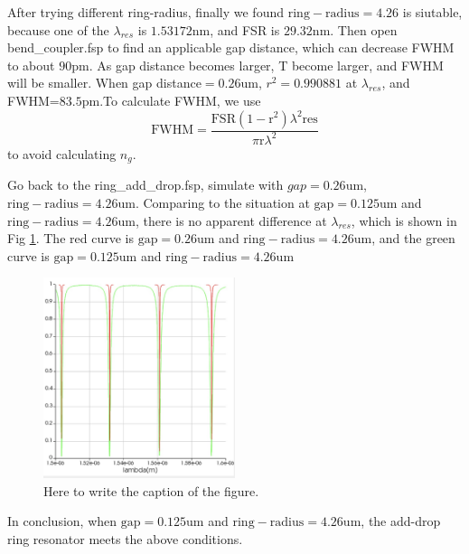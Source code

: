\documentclass[fontsize=11pt]{scrartcl}
\begin{document}
After trying different ring-radius, finally we found $\mathrm{ring-radius}=4.26$ is siutable, 
because one  of the $\lambda_{res}$ is $1.53172\mathrm{nm}$, and FSR is $29.32\mathrm{nm}$. 
Then open bend\_coupler.fsp to find an applicable gap distance, 
which can decrease FWHM to about $90\mathrm{pm}$. As gap distance becomes larger,
 T become larger, and FWHM will be smaller. When gap distance$=0.26\mathrm{um}$, $r^2=0.990881$ at $\lambda_{res}$, 
 and FWHM=$83.5\mathrm{pm}$.To calculate FWHM, we use
 \begin{equation}
    \mathrm{FWHM}=\frac{\mathrm{FSR}\left(1-\mathrm{r}^{2}\right) \lambda^{2} \mathrm{res}}{\pi \mathrm{r} \lambda^{2}}
    \label{eq5}
\end{equation}
 to avoid calculating $n_g$.

 Go back to the ring\_add\_drop.fsp, simulate with $gap=0.26\mathrm{um}$, 
 $\mathrm{ring-radius}=4.26\mathrm{um}$. Comparing to the situation at $\mathrm{gap}=0.125\mathrm{um}$ 
 and $\mathrm{ring-radius}=4.26\mathrm{um}$, there is no apparent difference at $\lambda_{res}$, 
 which is shown in Fig \ref{fig3.3}. The red curve is $\mathrm{gap}=0.26\mathrm{um}$ and 
 $\mathrm{ring-radius}=4.26\mathrm{um}$, and the green curve is 
 $\mathrm{gap}=0.125\mathrm{um}$ and 
 $\mathrm{ring-radius}=4.26\mathrm{um}$
 \begin{figure}[H]
    \centering
     \includegraphics[width=0.5\textwidth]{img/fig3.3.png}
     \caption{Here to write the caption of the figure.}
     \label{fig3.3}
\end{figure}  
In conclusion, when $\mathrm{gap}=0.125\mathrm{um}$ and 
$\mathrm{ring-radius}=4.26\mathrm{um}$, 
the add-drop ring resonator meets the above conditions.
\pagebreak
\end{document}
